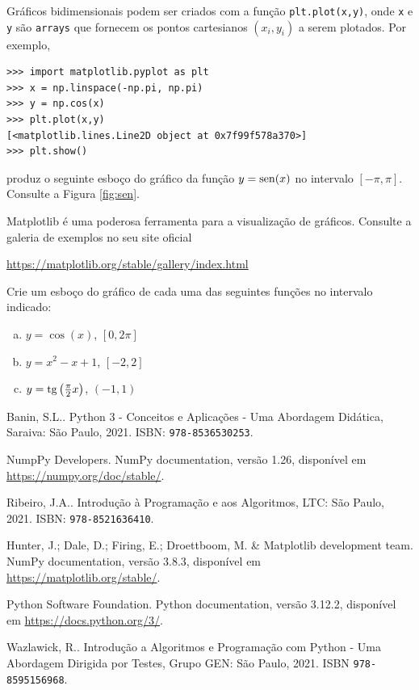 \documentclass[12pt]{article}
\begin{document}
Gráficos bidimensionais podem ser criados com a função \lstinline+plt.plot(x,y)+, onde \lstinline+x+ e \lstinline+y+ são \lstinline+arrays+ que fornecem os pontos cartesianos $(x_i, y_i)$ a serem plotados. Por exemplo,
\begin{lstlisting}
>>> import matplotlib.pyplot as plt
>>> x = np.linspace(-np.pi, np.pi)
>>> y = np.cos(x)
>>> plt.plot(x,y)
[<matplotlib.lines.Line2D object at 0x7f99f578a370>]
>>> plt.show()
\end{lstlisting}
produz o seguinte esboço do gráfico da função $y=\operatorname{sen}(x)$ no intervalo $[-\pi,\pi]$. Consulte a Figura \ref{fig:sen}.


\begin{obs}
  Matplotlib é uma poderosa ferramenta para a visualização de gráficos. Consulte a galeria de exemplos no seu site oficial
  \begin{center}
    \url{https://matplotlib.org/stable/gallery/index.html}
  \end{center}
\end{obs}

\begin{exr}
  Crie um esboço do gráfico de cada uma das seguintes funções no intervalo indicado:
  \begin{enumerate}[a)]
  \item $y = \cos(x)$, $\left[0, 2\pi\right]$
  \item $y = x^2 - x + 1$, $[-2, 2]$
  \item $y = \operatorname{tg}\left(\frac{\pi}{2}x\right)$, $(-1, 1)$
  \end{enumerate}
\end{exr}

% 

\begin{thebibliography}{99}
    Banin, S.L.. Python 3 - Conceitos e Aplicações - Uma Abordagem Didática, Saraiva: São Paulo, 2021. ISBN: \texttt{978-8536530253}.
    
    NumpPy Developers. NumPy documentation, versão 1.26, disponível em \url{https://numpy.org/doc/stable/}.

    Ribeiro, J.A.. Introdução à Programação e aos Algoritmos, LTC: São Paulo, 2021. ISBN: \texttt{978-8521636410}.
  
    Hunter, J.; Dale, D.; Firing, E.; Droettboom, M. \& Matplotlib development team. NumPy documentation, versão 3.8.3, disponível em \url{https://matplotlib.org/stable/}.
      
    Python Software Foundation. Python documentation, versão 3.12.2, disponível em \url{https://docs.python.org/3/}.
  
    Wazlawick, R.. Introdução a Algoritmos e Programação com Python - Uma Abordagem Dirigida por Testes, Grupo GEN: São Paulo, 2021. ISBN \texttt{978-8595156968}.
  \end{thebibliography}
  
\end{document}
